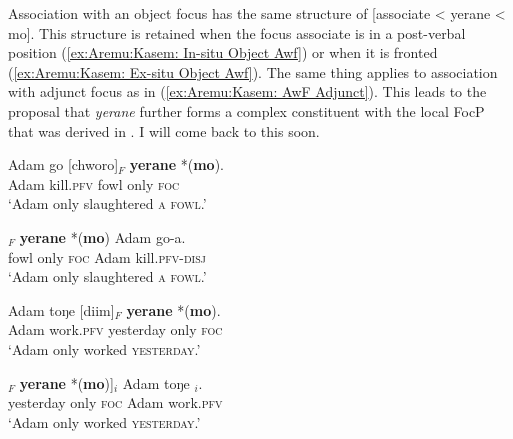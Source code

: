 \documentclass[output=paper,colorlinks,citecolor=brown,draftmode
]{langscibook}
\begin{document}
Association with an object focus has the same structure of [associate < yerane < mo]. This structure is retained when the focus associate is in a post-verbal position (\ref{ex:Aremu:Kasem: In-situ Object Awf}) or when it is fronted (\ref{ex:Aremu:Kasem: Ex-situ Object Awf}). The same thing applies to association with adjunct focus as in (\ref{ex:Aremu:Kasem: AwF Adjunct}).  This leads to the proposal that \textit{yerane} further forms a complex constituent with the local FocP that was derived in . I will come back to this soon.

\ea
\begin{xlist}

\ex \label{ex:Aremu:Kasem: In-situ Object Awf}
\gll Adam go [chworo]$_F$ \textbf{yerane} *(\textbf{mo}).\\
	Adam kill.\textsc{pfv} fowl only \textsc{foc}\\
\glt `Adam only slaughtered \textsc{a fowl}.'

\ex \label{ex:Aremu:Kasem: Ex-situ Object Awf}
\gll [Chworo]$_F$ \textbf{yerane} *(\textbf{mo}) Adam go-a.\\
	fowl only \textsc{foc} Adam kill.\textsc{pfv}-\textsc{disj}\\
\glt `Adam only slaughtered \textsc{a fowl}.'
    
\end{xlist}
\z

\ea \label{ex:Aremu:Kasem: AwF Adjunct}
\begin{xlist}
    
\ex   
\gll Adam toŋe [diim]$_F$ \textbf{yerane} *(\textbf{mo}).\\
	Adam work.\textsc{pfv} yesterday only \textsc{foc}\\
\glt `Adam only worked \textsc{yesterday}.'

\ex
\gll [[Diim]$_F$ \textbf{yerane} *(\textbf{mo})]$_i$ Adam toŋe \uline{\hspace{0.5cm}}$_i$.\\
   yesterday only \textsc{foc} Adam work.\textsc{pfv}\\
\glt `Adam only worked \textsc{yesterday}.'   

\end{xlist}
\z
   
\end{document}
